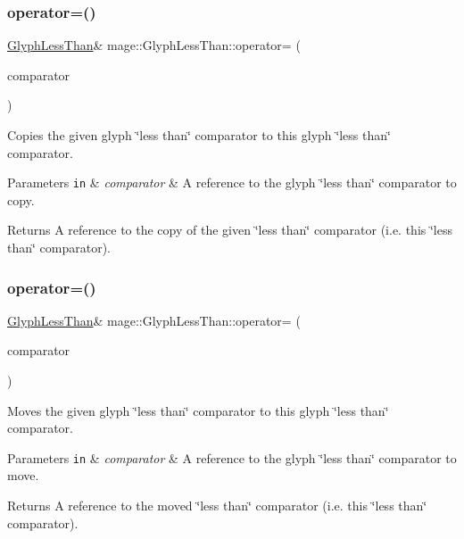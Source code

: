 \subsubsection{\texorpdfstring{operator=()}{operator=()}\hspace{0.1cm}{\footnotesize\ttfamily [1/2]}}
{\footnotesize\ttfamily \hyperlink{structmage_1_1_glyph_less_than}{Glyph\+Less\+Than}\& mage\+::\+Glyph\+Less\+Than\+::operator= (\begin{DoxyParamCaption}\item[{const \hyperlink{structmage_1_1_glyph_less_than}{Glyph\+Less\+Than} \&}]{comparator }\end{DoxyParamCaption})\hspace{0.3cm}{\ttfamily [default]}}

Copies the given glyph \char`\"{}less than\char`\"{} comparator to this glyph \char`\"{}less than\char`\"{} comparator.


\begin{DoxyParams}[1]{Parameters}
\mbox{\tt in}  & {\em comparator} & A reference to the glyph \char`\"{}less than\char`\"{} comparator to copy. \\
\hline
\end{DoxyParams}
\begin{DoxyReturn}{Returns}
A reference to the copy of the given \char`\"{}less than\char`\"{} comparator (i.\+e. this \char`\"{}less than\char`\"{} comparator). 
\end{DoxyReturn}
\hypertarget{structmage_1_1_glyph_less_than_aeee354f70d70e708e7478066c38166b2}{}\label{structmage_1_1_glyph_less_than_aeee354f70d70e708e7478066c38166b2} 
\subsubsection{\texorpdfstring{operator=()}{operator=()}\hspace{0.1cm}{\footnotesize\ttfamily [2/2]}}
{\footnotesize\ttfamily \hyperlink{structmage_1_1_glyph_less_than}{Glyph\+Less\+Than}\& mage\+::\+Glyph\+Less\+Than\+::operator= (\begin{DoxyParamCaption}\item[{\hyperlink{structmage_1_1_glyph_less_than}{Glyph\+Less\+Than} \&\&}]{comparator }\end{DoxyParamCaption})\hspace{0.3cm}{\ttfamily [default]}}

Moves the given glyph \char`\"{}less than\char`\"{} comparator to this glyph \char`\"{}less than\char`\"{} comparator.


\begin{DoxyParams}[1]{Parameters}
\mbox{\tt in}  & {\em comparator} & A reference to the glyph \char`\"{}less than\char`\"{} comparator to move. \\
\hline
\end{DoxyParams}
\begin{DoxyReturn}{Returns}
A reference to the moved \char`\"{}less than\char`\"{} comparator (i.\+e. this \char`\"{}less than\char`\"{} comparator). 
\end{DoxyReturn}
